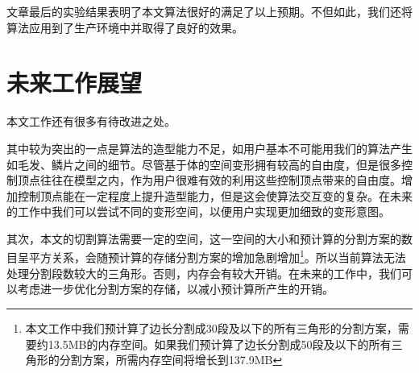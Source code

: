     文章最后的实验结果表明了本文算法很好的满足了以上预期。不但如此，我们还将算法应用到了生产环境中并取得了良好的效果。

\section{未来工作展望}
    本文工作还有很多有待改进之处。

    其中较为突出的一点是算法的造型能力不足，如用户基本不可能用我们的算法产生如毛发、鳞片之间的细节。尽管基于体的空间变形拥有较高的自由度，但是很多控制顶点往往在模型之内，作为用户很难有效的利用这些控制顶点带来的自由度。增加控制顶点能在一定程度上提升造型能力，但是这会使算法交互变的复杂。在未来的工作中我们可以尝试不同的变形空间，以便用户实现更加细致的变形意图。

    其次，本文的切割算法需要一定的空间，这一空间的大小和预计算的分割方案的数目呈平方关系，会随预计算的存储分割方案的增加急剧增加\footnote{本文工作中我们预计算了边长分割成30段及以下的所有三角形的分割方案，需要约13.5MB的内存空间。如果我们预计算了边长分割成50段及以下的所有三角形的分割方案，所需内存空间将增长到137.9MB}。所以当前算法无法处理分割段数较大的三角形。否则，内存会有较大开销。在未来的工作中，我们可以考虑进一步优化分割方案的存储，以减小预计算所产生的开销。


